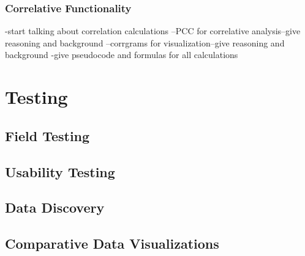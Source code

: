 \subsubsection{Correlative Functionality}

-start talking about correlation calculations
--PCC for correlative analysis--give reasoning and background
--corrgrams for visualization--give reasoning and background
-give pseudocode and formulas for all calculations



\section{Testing}

\subsection{Field Testing}

\subsection{Usability Testing}

\subsection{Data Discovery}

\subsection{Comparative Data Visualizations}
